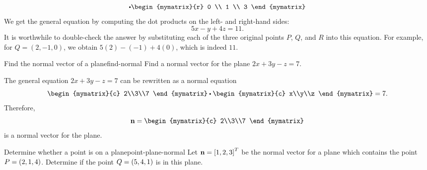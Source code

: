 \begin{solution}
\begin{equation*}
    \dotprod
    \begin{mymatrix}{r} 0 \\ 1 \\ 3 \end{mymatrix}
  \end{equation*}
  We get the general equation by computing the dot products on the
  left- and right-hand sides:
  \begin{equation*}
    5x - y + 4z = 11.
  \end{equation*}
  It is worthwhile to double-check the answer by substituting each of
  the three original points $P$, $Q$, and $R$ into this equation.
  For example, for $Q=(2,-1,0)$, we obtain $5(2)-(-1)+4(0)$, which is
  indeed $11$.
\end{solution}

\begin{example}{Find the normal vector of a plane}{find-normal}
  Find a normal vector for the plane $2x+3y-z=7$.
\end{example}

\begin{solution}
  The general equation $2x+3y-z=7$ can be rewritten as a normal
  equation
  \begin{equation*}
    \begin{mymatrix}{c} 2\\3\\7 \end{mymatrix}
    \dotprod
    \begin{mymatrix}{c} x\\y\\z \end{mymatrix}
    = 7.
  \end{equation*}
  Therefore,
  \begin{equation*}
    \vect{n} = \begin{mymatrix}{c} 2\\3\\7 \end{mymatrix}
  \end{equation*}
  is a normal vector for the plane.
\end{solution}

\begin{example}{Determine whether a point is on a plane}{point-plane-normal}
  Let $\mbox{\bf n} = \left[1,2,3\right]^T$ be the normal vector for a plane
  which contains the point $P = \left(2,1,4\right)$. Determine if the point
  $Q = \left(5,4,1\right)$ is in this plane.
\end{example}

